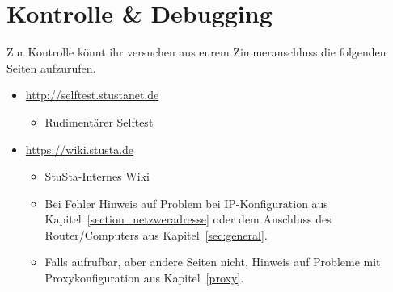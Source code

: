 \documentclass[a4paper,12pt]{scrartcl}
\begin{document}
\section{Kontrolle \& Debugging}
Zur Kontrolle könnt ihr versuchen aus eurem Zimmeranschluss die folgenden Seiten aufzurufen.
\begin{itemize}
	\item \url{http://selftest.stustanet.de}
	\begin{itemize}
		\item Rudimentärer Selftest
	\end{itemize}
	\item \url{https://wiki.stusta.de}
	\begin{itemize}
		\item StuSta-Internes Wiki
		\item Bei Fehler Hinweis auf Problem bei IP-Konfiguration aus Kapitel~\ref{section_netzweradresse} oder dem Anschluss des Router/Computers aus Kapitel~\ref{sec:general}.
		\item Falls aufrufbar, aber andere Seiten nicht, Hinweis auf Probleme mit Proxykonfiguration aus Kapitel~\ref{proxy}.
	\end{itemize}
\end{itemize}
\end{document}
